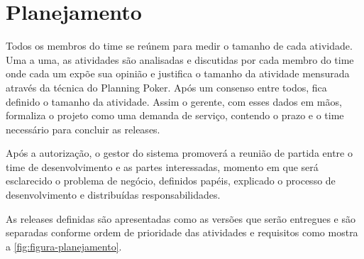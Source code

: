 \section{Planejamento}
\label{sec:atividadesRealizadasPlanejamento}

Todos os membros do time se reúnem para medir o tamanho de cada atividade. Uma a uma, as atividades são analisadas e discutidas por cada membro do time onde cada um expõe sua opinião e justifica o tamanho da atividade mensurada através da técnica do Planning Poker. Após um consenso entre todos, fica definido o tamanho da atividade. Assim o gerente, com esses dados em mãos, formaliza o projeto como uma demanda de serviço, contendo o prazo e o time necessário para concluir as releases.

\begin{citacao}
Após a autorização, o gestor do sistema promoverá a reunião de
partida entre o time de desenvolvimento e as partes interessadas, momento em que será
esclarecido o problema de negócio, definidos papéis, explicado o processo de
desenvolvimento e distribuídas responsabilidades.\cite[p.~2]{Portaria37:2017}
\end{citacao}

As releases definidas são apresentadas como as versões que serão entregues e são separadas conforme ordem de prioridade das atividades e requisitos como mostra a \autoref{fig:figura-planejamento}.


